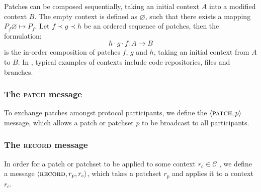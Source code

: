 Patches can be composed sequentially, taking an initial context $A$ into
a modified context $B$. The empty context is defined as $\varnothing$, such
that there exists a mapping $P_f \varnothing \mapsto P_f$. Let $f \prec g
\prec h$ be an ordered sequence of patches, then the formulation:
\[
    h \cdot g \cdot f : A \to B
\]
is the in-order composition of patches $f$, $g$ and $h$, taking an initial
context from $A$ to $B$. In \oscoin{}, typical examples of contexts include
code repositories, files and branches.







\subsubsection{The \textsc{patch} message}
\label{patch-op}

To exchange patches amongst protocol participants, we define the
$\langle \text{\normalfont\scshape patch}, p \rangle$ message, which allows a patch or patchset $p$ to be broadcast
to all participants.

\subsubsection{The \textsc{record} message}
\label{record-op}

In order for a patch or patchset to be applied to some context $r_c \in
\mathcal{C}$ , we define a message $\langle \text{\normalfont\scshape record}, r_p, r_c \rangle$, which takes a
patchset $r_p$ and applies it to a context $r_c$.

